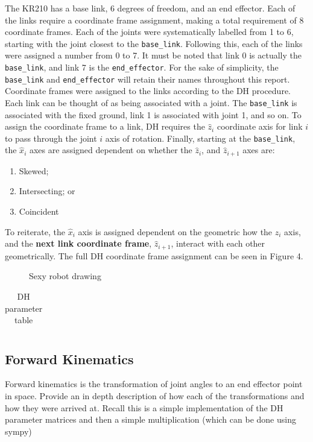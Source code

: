 \documentclass[a4paper]{article}
\begin{document}
The KR210 has a base link, 6 degrees of freedom, and an end effector. Each of the links require a coordinate frame assignment, making a total requirement of 8 coordinate frames. Each of the joints were systematically labelled from 1 to 6, starting with the joint closest to the \verb|base_link|. Following this, each of the links were assigned a number from 0 to 7. It must be noted that link 0 is actually the \verb|base_link|, and link 7 is the \verb|end_effector|. For the sake of simplicity, the \verb|base_link| and \verb|end_effector| will retain their names throughout this report. Coordinate frames were assigned to the links according to the DH procedure. Each link can be thought of as being associated with a joint. The \verb|base_link| is associated with the fixed ground, link 1 is associated with joint 1, and so on. To assign the coordinate frame to a link, DH requires the $\hat{z}_i$ coordinate axis for link $i$ to pass through the joint $i$ axis of rotation. Finally, starting at the \verb|base_link|, the $\hat{x}_i$ axes are assigned dependent on whether the $\hat{z}_i$, and $\hat{z}_{i+1}$ axes are:
\begin{enumerate}
\item Skewed; 
\item Intersecting; or
\item Coincident
\end{enumerate}

To reiterate, the $\hat{x}_i$ axis is assigned dependent on the geometric how the $\hat{z}_i$ axis, and the \textbf{next link coordinate frame}, $\hat{z}_{i+1}$, interact with each other geometrically. The full DH coordinate frame assignment can be seen in Figure 4.

\begin{figure}[h]
\centering
\scalebox{0.8}{}
\caption{Sexy robot drawing}
\end{figure}

\begin{table}
\centering
\caption{DH parameter table}
\begin{tabular}{ll}
\toprule

\midrule

\bottomrule
\end{tabular}
\end{table}

\subsection{Forward Kinematics}
Forward kinematics is the transformation of joint angles to an end effector point in space. Provide an in depth description of how each of the transformations and how they were arrived at. Recall this is a simple implementation of the DH parameter matrices and then a simple multiplication (which can be done using sympy)
\end{document}
